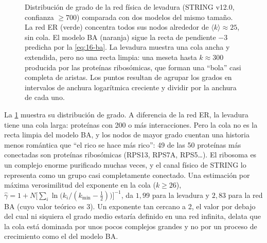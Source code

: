\begin{figure}[t]
\centering
{}
\caption[Distribución de grado en escala doble logarítmica]{Distribución de grado de la red física de levadura (STRING v12.0, confianza $\ge700$) comparada con dos modelos del mismo tamaño. La red ER (verde) concentra todos sus nodos alrededor de $\langle k\rangle\approx25$, sin cola. El modelo BA (naranja) sigue la recta de pendiente $-3$ predicha por la \cref{eq:16-ba}. La levadura muestra una cola ancha y extendida, pero no una recta limpia: una meseta hasta $k\approx300$ producida por las proteínas ribosómicas, que forman una ``bola'' casi completa de aristas. Los puntos resultan de agrupar los grados en intervalos de anchura logarítmica creciente y dividir por la anchura de cada uno.}
\label{fig:16-grado}
\end{figure}

La \cref{fig:16-grado} muestra su distribución de grado. A diferencia de la red ER, la levadura tiene una cola larga: proteínas con 200 o más interacciones. Pero la cola no es la recta limpia del modelo BA, y los nodos de mayor grado cuentan una historia menos romántica que ``el rico se hace más rico'': 49 de las 50 proteínas más conectadas son proteínas ribosómicas (RPS13, RPS7A, RPS5\dots). El ribosoma es un complejo enorme purificado muchas veces, y el canal físico de STRING lo representa como un grupo casi completamente conectado. Una estimación por máxima verosimilitud del exponente en la cola ($k\ge26$), $\hat\gamma=1+N\big[\sum_i\ln\big(k_i/(k_{\min}-\tfrac12)\big)\big]^{-1}$, da $1{,}99$ para la levadura y $2{,}83$ para la red BA (cuyo valor teórico es 3). Un exponente tan cercano a 2, el valor por debajo del cual ni siquiera el grado medio estaría definido en una red infinita, delata que la cola está dominada por unos pocos complejos grandes y no por un proceso de crecimiento como el del modelo BA.

